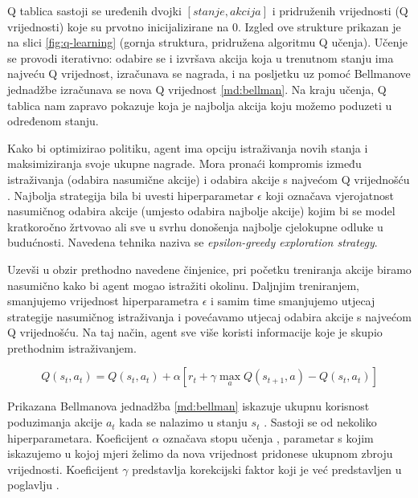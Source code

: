 Q tablica sastoji se uređenih dvojki $[stanje, akcija]$ i pridruženih vrijednosti (Q vrijednosti) koje su prvotno inicijalizirane na $0$. Izgled ove strukture prikazan je na slici \ref{fig:q-learning} (gornja struktura, pridružena algoritmu Q učenja). Učenje se provodi iterativno: odabire se i izvršava akcija koja u trenutnom stanju ima najveću Q vrijednost, izračunava se nagrada, i na posljetku uz pomoć Bellmanove jednadžbe izračunava se nova Q vrijednost \ref{md:bellman}. Na kraju učenja, Q tablica nam zapravo pokazuje koja je najbolja akcija koju možemo poduzeti u određenom stanju.

Kako bi optimizirao politiku, agent ima opciju istraživanja novih stanja i maksimiziranja svoje ukupne nagrade. Mora pronaći kompromis između istraživanja (odabira nasumične akcije)  i odabira akcije s najvećom Q vrijednošću  \cite{QL}. Najbolja strategija bila bi uvesti hiperparametar $\epsilon$ koji označava vjerojatnost nasumičnog odabira akcije (umjesto odabira najbolje akcije) kojim bi se model kratkoročno žrtvovao ali sve u svrhu donošenja najbolje cjelokupne odluke u budućnosti. Navedena tehnika naziva se \textit{epsilon-greedy exploration strategy}.

Uzevši u obzir prethodno navedene činjenice, pri početku treniranja akcije biramo nasumično kako bi agent mogao istražiti okolinu. Daljnjim treniranjem, smanjujemo vrijednost hiperparametra $\epsilon$ i samim time smanjujemo utjecaj strategije nasumičnog istraživanja i povećavamo utjecaj odabira akcije s najvećom Q vrijednošću. Na taj način, agent sve više koristi informacije koje je skupio prethodnim istraživanjem. 

\begin{equation}
    \label{md:bellman}
    Q(s_t, a_t) = Q(s_t, a_t) + \alpha \left[ r_t + \gamma \max_a Q(s_{t+1}, a) - Q(s_t, a_t) \right]
\end{equation}

\bigskip

Prikazana Bellmanova jednadžba \ref{md:bellman} iskazuje ukupnu korisnost poduzimanja akcije $a_t$ kada se nalazimo u stanju $s_t$ \cite{PodUceFer}. Sastoji se od nekoliko hiperparametara. Koeficijent $\alpha$ označava stopu učenja , parametar s kojim iskazujemo u kojoj mjeri želimo da nova vrijednost pridonese ukupnom zbroju vrijednosti. Koeficijent $\gamma$ predstavlja korekcijski faktor  koji je već predstavljen u poglavlju . 

